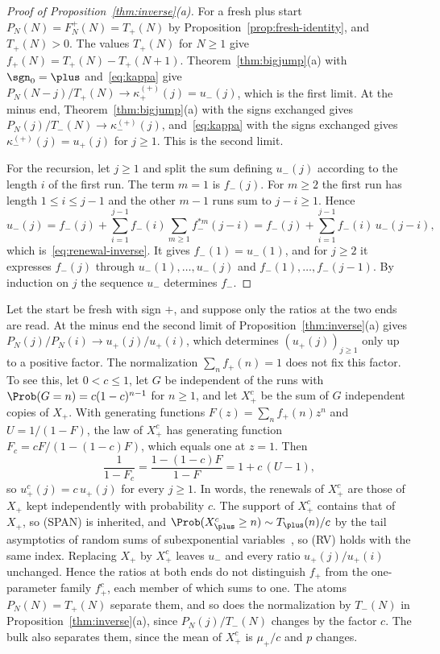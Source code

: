 \begin{proof}[Proof of Proposition~\ref{thm:inverse}(a)]
For a fresh plus start $P_N(N)=F^\plus_N(N)=T_\plus(N)$ by
Proposition~\ref{prop:fresh-identity}, and $T_\plus(N)>0$. The values $T_\plus(N)$ for
$N\ge1$ give $f_\plus(N)=T_\plus(N)-T_\plus(N+1)$. Theorem~\ref{thm:bigjump}(a)
with $\sgn_0=\plus$ and~\eqref{eq:kappa} give $P_N(N-j)/T_\plus(N)\to
\kappa^{(\plus)}_\plus(j)=u_\minus(j)$, which is the first limit. At the minus
end, Theorem~\ref{thm:bigjump}(a) with the signs exchanged gives
$P_N(j)/T_\minus(N)\to\kappa^{(\plus)}_\minus(j)$, and~\eqref{eq:kappa} with the
signs exchanged gives $\kappa^{(\plus)}_\minus(j)=u_\plus(j)$ for $j\ge1$. This
is the second limit.

For the recursion, let $j\ge1$ and split the sum defining $u_\minus(j)$
according to the length $i$ of the first run. The term $m=1$ is $f_\minus(j)$.
For $m\ge2$ the first run has length $1\le i\le j-1$ and the other $m-1$ runs
sum to $j-i\ge1$. Hence
\[
 u_\minus(j)=f_\minus(j)+\sum_{i=1}^{j-1}f_\minus(i)\sum_{m\ge1}f_\minus^{*m}(j-i)
 =f_\minus(j)+\sum_{i=1}^{j-1}f_\minus(i)\,u_\minus(j-i),
\]
which is~\eqref{eq:renewal-inverse}. It gives $f_\minus(1)=u_\minus(1)$, and
for $j\ge2$ it expresses $f_\minus(j)$ through $u_\minus(1),\dots,u_\minus(j)$ and
$f_\minus(1),\dots,f_\minus(j-1)$. By induction on $j$ the sequence $u_\minus$
determines $f_\minus$.
\end{proof}

\begin{remark}\label{rem:thinning}
Let the start be fresh with sign $\plus$, and suppose only the ratios at the
two ends are read. At the minus end the second limit of
Proposition~\ref{thm:inverse}(a) gives $P_N(j)/P_N(i)\to u_\plus(j)/u_\plus(i)$, which
determines $(u_\plus(j))_{j\ge1}$ only up to a positive factor. The normalization
$\sum_nf_\plus(n)=1$ does not fix this factor. To see this, let $0<c\le1$, let $G$ be
independent of the runs with $\Prob(G=n)=c(1-c)^{n-1}$ for $n\ge1$, and let
$X^c_\plus$ be the sum of $G$ independent copies of $X_\plus$. With generating functions
$F(z)=\sum_nf_\plus(n)z^n$ and $U=1/(1-F)$, the law of $X^c_\plus$ has generating
function $F_c=cF/(1-(1-c)F)$, which equals one at $z=1$. Then
\[
 \frac1{1-F_c}=\frac{1-(1-c)F}{1-F}=1+c\,(U-1),
\]
so $u^c_\plus(j)=c\,u_\plus(j)$ for every $j\ge1$. In words, the renewals of
$X^c_\plus$ are those of $X_\plus$ kept independently with probability $c$. The
support of $X^c_\plus$ contains that of $X_\plus$, so (SPAN) is inherited, and
$\Prob(X^c_\plus\ge n)\sim T_\plus(n)/c$ by the tail asymptotics of random sums of
subexponential variables~\cite{ekm1997}, so (RV) holds with the same index.
Replacing $X_\plus$ by $X^c_\plus$ leaves $u_\minus$ and every ratio
$u_\plus(j)/u_\plus(i)$ unchanged. Hence the ratios at both ends do not
distinguish $f_\plus$ from the one-parameter family $f^c_\plus$, each member of
which sums to one. The atoms $P_N(N)=T_\plus(N)$ separate them, and so does the
normalization by $T_\minus(N)$ in Proposition~\ref{thm:inverse}(a), since
$P_N(j)/T_\minus(N)$ changes by the factor $c$. The bulk also separates them, since
the mean of $X^c_\plus$ is $\mu_\plus/c$ and $p$ changes.
\end{remark}

